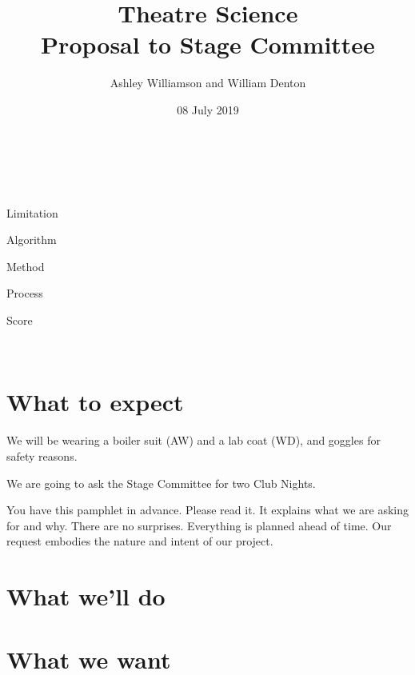 \documentclass[12pt]{article}
\title{Theatre Science \\ \large Proposal to Stage Committee}
\author{Ashley Williamson and William Denton}
\date{08 July 2019}
\begin{document}
\begin{center}

  \\
  \vspace{0.2cm}
  \\
  \vspace{1cm}

  \vspace{3cm}

  {\Huge
    Limitation

    \vspace{0.5cm}

    Algorithm
    \vspace{0.5cm}

    Method
    \vspace{0.5cm}

    Process
    \vspace{0.5cm}

    Score
  }

\vspace{3cm}

\\

\end{center}

\clearpage

\section{What to expect}

We will be wearing a boiler suit (AW) and a lab coat (WD), and goggles for safety reasons.

We are going to ask the Stage Committee for two Club Nights.

You have this pamphlet in advance.  Please read it.  It explains what we are asking for and why.  There are no surprises.  Everything is planned ahead of time.  Our request embodies the nature and intent of our project.

\section{What we'll do}

\lipsum[1]

\section{What we want}
\end{document}
